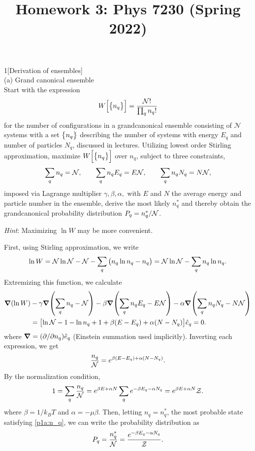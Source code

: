 \documentclass[12pt]{article}
\title{Homework 3: Phys 7230 (Spring 2022)}
\begin{document}
\maketitle
\begin{problem}{1}[Derivation of ensembles]~\\
(a) Grand canonical ensemble~\\
Start with the expression
\begin{equation}
    W\qty[\qty{n_q}]=\frac{\mathcal{N}!}{\prod_qn_q!} 
\end{equation}
for the number of configurations in a grandcanonical ensemble consisting of
$\mathcal{N}$ systems with a set $\qty{n_q}$ describing the number of systems
with energy $E_q$ and number of particles $N_q$, discussed in lectures.
Utilizing lowest order Stirling approximation, maximize $W\qty[\qty{n_q}]$ over
$n_q$, subject to three constraints,
\begin{equation}
    \sum_qn_q=\mathcal{N},\qquad\sum_qn_qE_q=E\mathcal{N},\qquad\sum_qn_qN_q=N\mathcal{N} ,
\end{equation}
imposed via Lagrange multiplier $\gamma,\beta,\alpha,$ with $E$ and $N$ the
average energy and particle number in the ensemble, derive the most likely
$n_q^\ast$ and thereby obtain the grandcanonical probability distribution
$P_q=n_q^\ast/\mathcal{N}$.

\textit{Hint}: Maximizing $\ln W$ may be more convenient.
\begin{solution}
First, using Stirling approximation, we write
\begin{equation}
    \ln W=\mathcal{N}\ln\mathcal{N} -\mathcal{N}-\sum_q\qty(n_q\ln n_q - n_q)
    =\mathcal{N}\ln\mathcal{N}-\sum_qn_q\ln n_q.
\end{equation}
Extremizing this function, we calculate
\begin{align}
    \grad(\ln W)
    &-\gamma\grad\qty(\sum_qn_q-\mathcal{N})
    -\beta\grad\qty(\sum_qn_qE_q-E\mathcal{N})
    -\alpha\grad\qty(\sum_qn_qN_q-N\mathcal{N})\notag\\
    \qquad&=
    \qty[\ln\mathcal{N}-1-\ln n_q+1+\beta(E-E_q)+\alpha(N-N_q)]\hat{e}_q=0.
\end{align}
where $\grad=(\partial/\partial n_q)\hat{e}_q$ (Einstein summation used
implicitly). Inverting each expression, we get
\begin{equation}\label{p1a:n_q}
    \frac{n_q}{\mathcal{N}}=e^{\beta(E-E_q)+\alpha(N-N_q)}.
\end{equation}
By the normalization condition,
\begin{equation}
    1=\sum_q\frac{n_q}{\mathcal{N}}=e^{\beta E+\alpha N}\sum_qe^{-\beta E_q-\alpha N_q}
    =e^{\beta E+\alpha N}\mathcal{Z}.
\end{equation}
where $\beta=1/k_BT$ and $\alpha=-\mu\beta$. Then, letting $n_q=n_q^\ast$, the
most probable state satisfying \eqref{p1a:n_q}, we can write the probability
distribution as
\begin{equation}
    P_q=\frac{n_q^\ast}{\mathcal{N}}=\frac{e^{-\beta E_q-\alpha N_q}}{\mathcal{Z}}  .
\end{equation}
\end{solution}


\end{problem}
\end{document}
